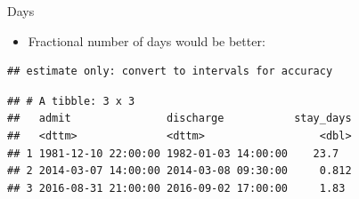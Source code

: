 \documentclass[ignorenonframetext,]{beamer}
\newenvironment{Shaded}{\begin{snugshade}}{\end{snugshade}}
\newcommand{\CommentTok}[1]{\textcolor[rgb]{0.56,0.35,0.01}{\textit{#1}}}
\newcommand{\DataTypeTok}[1]{\textcolor[rgb]{0.13,0.29,0.53}{#1}}
\newcommand{\DecValTok}[1]{\textcolor[rgb]{0.00,0.00,0.81}{#1}}
\newcommand{\KeywordTok}[1]{\textcolor[rgb]{0.13,0.29,0.53}{\textbf{#1}}}
\newcommand{\NormalTok}[1]{#1}
\newcommand{\OperatorTok}[1]{\textcolor[rgb]{0.81,0.36,0.00}{\textbf{#1}}}
\newcommand{\StringTok}[1]{\textcolor[rgb]{0.31,0.60,0.02}{#1}}
\providecommand{\tightlist}{%
  \setlength{\itemsep}{0pt}\setlength{\parskip}{0pt}}
\begin{document}
\begin{frame}[fragile]{Days}
\protect\hypertarget{days}{}

\begin{itemize}
\tightlist
\item
  Fractional number of days would be better:
\end{itemize}

\begin{Shaded}
\end{Shaded}

\begin{verbatim}
## estimate only: convert to intervals for accuracy
\end{verbatim}

\begin{verbatim}
## # A tibble: 3 x 3
##   admit               discharge           stay_days
##   <dttm>              <dttm>                  <dbl>
## 1 1981-12-10 22:00:00 1982-01-03 14:00:00    23.7  
## 2 2014-03-07 14:00:00 2014-03-08 09:30:00     0.812
## 3 2016-08-31 21:00:00 2016-09-02 17:00:00     1.83
\end{verbatim}

\end{frame}
\end{document}
